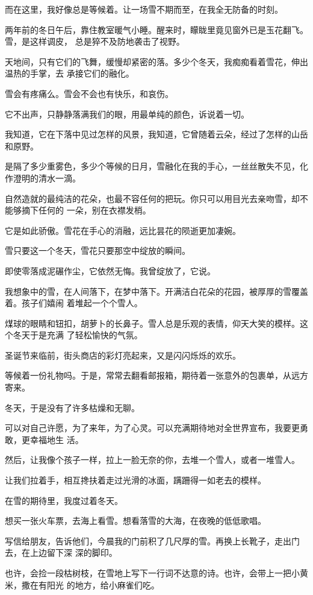 		而在这里，我好像总是等候着。让一场雪不期而至，在我全无防备的时刻。

		两年前的冬日午后，靠住教室暖气小睡。醒来时，矇眬里竟见窗外已是玉花翻飞。雪，是这样调皮，
	总是猝不及防地袭击了视野。

		天地间，只有它们的飞舞，缓慢却紧密的落。多少个冬天，我痴痴看着雪花，伸出温热的手掌，去
	承接它们的融化。

		雪会有疼痛么。雪会不会也有快乐，和哀伤。\par
		它不出声，只静静落满我们的眼，用最单纯的颜色，诉说着一切。\par
		我知道，它在下落中见过怎样的风景，我知道，它曾随着云朵，经过了怎样的山岳和原野。\par
		是隔了多少重雾色，多少个等候的日月，雪融化在我的手心，一丝丝散失不见，化作澄明的清水一滴。

		自然造就的最纯洁的花朵，也最不容任何的把玩。你只可以用目光去亲吻雪，却不能够摘下任何的
	一朵，别在衣襟发梢。

		它是如此骄傲。雪花在手心的消融，远比昙花的陨逝更加凄婉。\par
		雪只要这一个冬天，雪花只要那空中绽放的瞬间。\par
		即使零落成泥碾作尘，它依然无悔。我曾绽放了，它说。

		我想象中的雪，在人间落下，在梦中落下。开满洁白花朵的花园，被厚厚的雪覆盖着。孩子们嬉闹
	着堆起一个个雪人。

		煤球的眼睛和钮扣，胡萝卜的长鼻子。雪人总是乐观的表情，仰天大笑的模样。这个冬天于是充满
	了轻松愉快的气氛。

		圣诞节来临前，街头商店的彩灯亮起来，又是闪闪烁烁的欢乐。\par
		等候着一份礼物吗。于是，常常去翻看邮报箱，期待着一张意外的包裹单，从远方寄来。\par
		冬天，于是没有了许多枯燥和无聊。

		可以对自己许愿，为了来年，为了心灵。可以充满期待地对全世界宣布，我要更勇敢，更幸福地生
	活。

		然后，让我像个孩子一样，拉上一脸无奈的你，去堆一个雪人，或者一堆雪人。\par
		让我们拉着手，相互搀扶着走过光滑的冰面，蹒跚得一如老去的模样。

		在雪的期待里，我度过着冬天。

		想买一张火车票，去海上看雪。想看落雪的大海，在夜晚的低低歌唱。

		写信给朋友，告诉他们，今晨我的门前积了几尺厚的雪。再换上长靴子，走出门去，在上边留下深
	深的脚印。

		也许，会捡一段枯树枝，在雪地上写下一行词不达意的诗。也许，会带上一把小黄米，撒在有阳光
	的地方，给小麻雀们吃。

